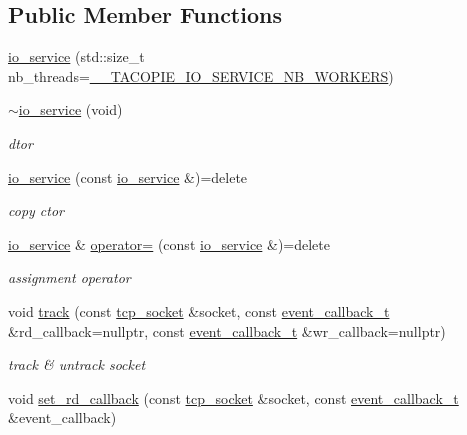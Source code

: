 \subsection*{Public Member Functions}
\begin{DoxyCompactItemize}
\item 
\hyperlink{classtacopie_1_1io__service_a62edde9b62571610413d99d075df8102}{io\+\_\+service} (std\+::size\+\_\+t nb\+\_\+threads=\hyperlink{io__service_8hpp_a822f465d034836ecbc765ad422eec064}{\+\_\+\+\_\+\+T\+A\+C\+O\+P\+I\+E\+\_\+\+I\+O\+\_\+\+S\+E\+R\+V\+I\+C\+E\+\_\+\+N\+B\+\_\+\+W\+O\+R\+K\+E\+RS})
\item 
\hyperlink{classtacopie_1_1io__service_ae423d7e4b13f07fe41fb051345ffbf8d}{$\sim$io\+\_\+service} (void)
\begin{DoxyCompactList}\small\item\em dtor \end{DoxyCompactList}\item 
\hyperlink{classtacopie_1_1io__service_ad5da7503d8fec083c6d28455ec9e21c7}{io\+\_\+service} (const \hyperlink{classtacopie_1_1io__service}{io\+\_\+service} \&)=delete
\begin{DoxyCompactList}\small\item\em copy ctor \end{DoxyCompactList}\item 
\hyperlink{classtacopie_1_1io__service}{io\+\_\+service} \& \hyperlink{classtacopie_1_1io__service_a980652008516b38357d405c16eda07fa}{operator=} (const \hyperlink{classtacopie_1_1io__service}{io\+\_\+service} \&)=delete
\begin{DoxyCompactList}\small\item\em assignment operator \end{DoxyCompactList}\item 
void \hyperlink{classtacopie_1_1io__service_a9f4c8bce3c0f6d660515b0b5eb109df8}{track} (const \hyperlink{classtacopie_1_1tcp__socket}{tcp\+\_\+socket} \&socket, const \hyperlink{classtacopie_1_1io__service_abb66850c32d9c724f4418d77bd04bcfd}{event\+\_\+callback\+\_\+t} \&rd\+\_\+callback=nullptr, const \hyperlink{classtacopie_1_1io__service_abb66850c32d9c724f4418d77bd04bcfd}{event\+\_\+callback\+\_\+t} \&wr\+\_\+callback=nullptr)
\begin{DoxyCompactList}\small\item\em track \& untrack socket \end{DoxyCompactList}\item 
void \hyperlink{classtacopie_1_1io__service_a8094c1fec76c6821cc0c008fe524c89a}{set\+\_\+rd\+\_\+callback} (const \hyperlink{classtacopie_1_1tcp__socket}{tcp\+\_\+socket} \&socket, const \hyperlink{classtacopie_1_1io__service_abb66850c32d9c724f4418d77bd04bcfd}{event\+\_\+callback\+\_\+t} \&event\+\_\+callback)

\end{DoxyCompactItemize}
